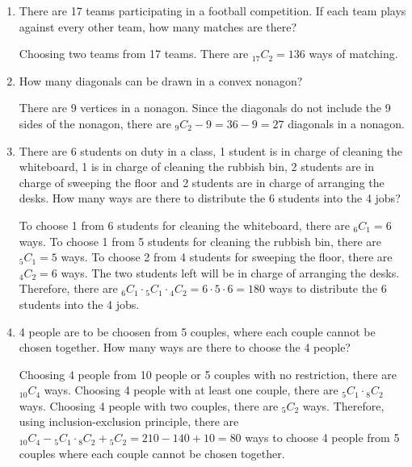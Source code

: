 \documentclass{report}
\newcommand\comb[2][^n]{{}_{#1}C_{#2}}
\begin{document}
\begin{multicols}{2}
\begin{enumerate}
    \item There are 17 teams participating in a football competition. If each team plays
          against every other team, how many matches are there? \sol{}

          Choosing two teams from 17 teams. There are $\comb[17]{2} = 136$ ways of
          matching.

    \item How many diagonals can be drawn in a convex nonagon? \sol{}

          There are 9 vertices in a nonagon. Since the diagonals do not include the 9
          sides of the nonagon, there are $\comb[9]{2} - 9 = 36 - 9 = 27$ diagonals in a
          nonagon.

    \item There are 6 students on duty in a class, 1 student is in charge of cleaning the
          whiteboard, 1 is in charge of cleaning the rubbish bin, 2 students are in
          charge of sweeping the floor and 2 students are in charge of arranging the
          desks. How many ways are there to distribute the 6 students into the 4 jobs?
          \sol{}

          To choose 1 from 6 students for cleaning the whiteboard, there are $\comb[6]{1}
            = 6$ ways. To choose 1 from 5 students for cleaning the rubbish bin, there are
          $\comb[5]{1} = 5$ ways. To choose 2 from 4 students for sweeping the floor,
          there are $\comb[4]{2} = 6$ ways. The two students left will be in charge of
          arranging the desks. Therefore, there are $\comb[6]{1} \cdot \comb[5]{1} \cdot
            \comb[4]{2} = 6 \cdot 5 \cdot 6 = 180$ ways to distribute the 6 students into
          the 4 jobs.

    \item 4 people are to be choosen from 5 couples, where each couple cannot be chosen together. How many ways are there to choose the 4 people?
          \sol{}

          Choosing 4 people from 10 people or 5 couples with no restriction, there are
          $\comb[10]{4}$ ways. Choosing 4 people with at least one couple, there are
          $\comb[5]{1} \cdot \comb[8]{2}$ ways. Choosing 4 people with two couples, there
          are $\comb[5]{2}$ ways. Therefore, using inclusion-exclusion principle, there
          are $\comb[10]{4} - \comb[5]{1} \cdot \comb[8]{2} + \comb[5]{2} = 210 - 140 +
            10 = 80$ ways to choose 4 people from 5 couples where each couple cannot be
          chosen together.


\end{enumerate}
\end{multicols}
\end{document}
